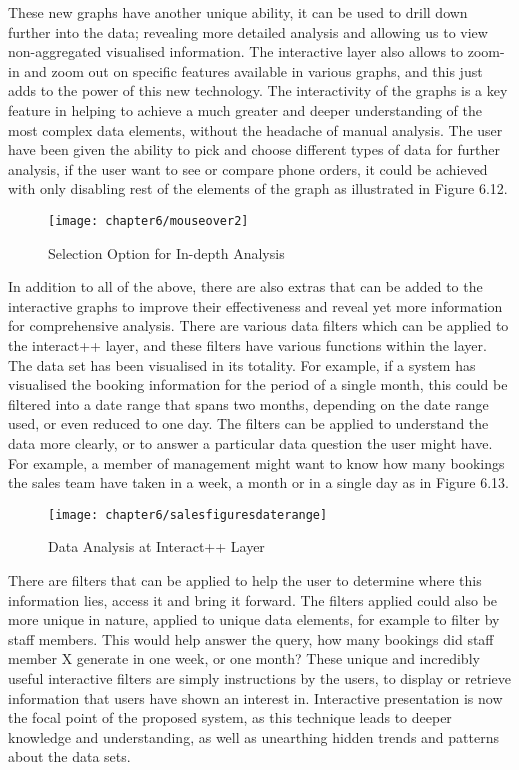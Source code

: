 These new graphs have another unique ability, it can be used to drill down further into the data; revealing more detailed analysis and allowing us to view non-aggregated visualised information. The interactive layer also allows to zoom-in and zoom out on specific features available in various graphs, and this just adds to the power of this new technology. The interactivity of the graphs is a key feature in helping to achieve a much greater and deeper understanding of the most complex data elements, without the headache of manual analysis. The user have been given the ability to pick and choose different types of data for further analysis, if the user want to see or compare phone orders, it could be achieved with only disabling rest of the elements of the graph as illustrated in Figure 6.12.

\begin{figure}[H]
\centering
\texttt{[image: chapter6/mouseover2]}
\caption{Selection Option for In-depth Analysis}
\end{figure}

In addition to all of the above, there are also extras that can be added to the interactive graphs to improve their effectiveness and reveal yet more information for comprehensive analysis. There are various data filters which can be applied to the interact++ layer, and these filters have various functions within the layer. The data set has been visualised in its totality. For example, if a system has visualised the booking information for the period of a single month, this could be filtered into a date range that spans two months, depending on the date range used, or even reduced to one day.  The filters can be applied to understand the data more clearly, or to answer a particular data question the user might have. For example, a member of management might want to know how many bookings the sales team have taken in a week, a month or in a single day as in Figure 6.13.

\begin{figure}[H]
\centering
\texttt{[image: chapter6/salesfiguresdaterange]}
\caption{Data Analysis at Interact++ Layer}
\end{figure}

There are filters that can be applied to help the user to determine where this information lies, access it and bring it forward. The filters applied could also be more unique in nature, applied to unique data elements, for example to filter by staff members. This would help answer the query, how many bookings did staff member X generate in one week, or one month? These unique and incredibly useful interactive filters are simply instructions by the users, to display or retrieve information that users have shown an interest in. Interactive presentation is now the focal point of the proposed system, as this technique leads to deeper knowledge and understanding, as well as unearthing hidden trends and patterns about the data sets.

